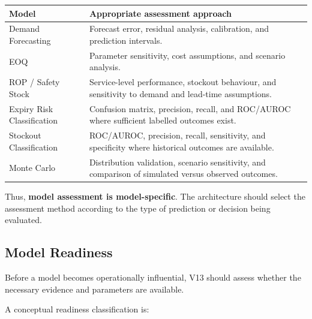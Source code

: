 \documentclass[12pt]{article}
\begin{document}
\begin{center}

\begin{tabularx}{\textwidth}{p{42mm} X}
\hline
\textbf{Model} &
\textbf{Appropriate assessment approach} \\
\hline

Demand Forecasting &
Forecast error, residual analysis, calibration, and prediction intervals. \\

EOQ &
Parameter sensitivity, cost assumptions, and scenario analysis. \\

ROP / Safety Stock &
Service-level performance, stockout behaviour, and sensitivity to demand and
lead-time assumptions. \\

Expiry Risk Classification &
Confusion matrix, precision, recall, and ROC/AUROC where sufficient labelled
outcomes exist. \\

Stockout Classification &
ROC/AUROC, precision, recall, sensitivity, and specificity where historical
outcomes are available. \\

Monte Carlo &
Distribution validation, scenario sensitivity, and comparison of simulated
versus observed outcomes. \\

\hline
\end{tabularx}

\end{center}

Thus, \textbf{model assessment is model-specific}. The architecture should
select the assessment method according to the type of prediction or decision
being evaluated.

\subsection{Model Readiness}

Before a model becomes operationally influential, V13 should assess whether
the necessary evidence and parameters are available.

A conceptual readiness classification is:
\end{document}
